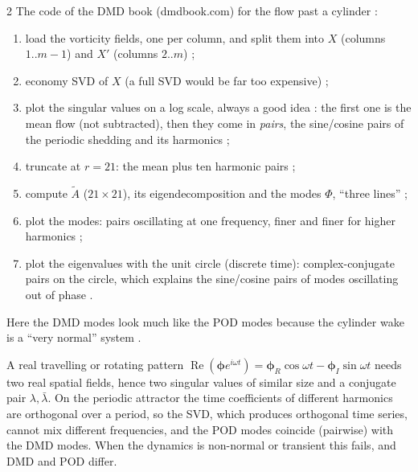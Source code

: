 \begin{paracol}{2}
The code of the DMD book (dmdbook.com) for the flow past a cylinder :
\begin{enumerate}
  \item load the vorticity fields, one per column, and split them into $X$ (columns $1..m-1$) and $X'$
        (columns $2..m$) ;
  \item economy SVD of $X$ (a full SVD would be far too expensive) ;
  \item plot the singular values on a log scale, always a good idea : the first one is the
        mean flow (not subtracted), then they come in \emph{pairs}, the sine/cosine pairs of the periodic
        shedding and its harmonics ;
  \item truncate at $r=21$: the mean plus ten harmonic pairs ;
  \item compute $\tilde A$ ($21\times21$), its eigendecomposition and the modes $\Phi$, ``three lines''
        ;
  \item plot the modes: pairs oscillating at one frequency, finer and finer for higher harmonics
        ;
  \item plot the eigenvalues with the unit circle (discrete time): complex-conjugate pairs on the circle,
        which explains the sine/cosine pairs of modes oscillating out of phase .
\end{enumerate}
Here the DMD modes look much like the POD modes because the cylinder wake is a ``very normal'' system
.

\begin{secondary}
A real travelling or rotating pattern $\operatorname{Re}(\boldsymbol\phi e^{i\omega t})=
\boldsymbol\phi_R\cos\omega t-\boldsymbol\phi_I\sin\omega t$ needs two real spatial fields, hence two
singular values of similar size and a conjugate pair $\lambda,\bar\lambda$. On the periodic attractor the
time coefficients of different harmonics are orthogonal over a period, so the SVD, which produces
orthogonal time series, cannot mix different frequencies, and the POD modes coincide (pairwise) with the
DMD modes. When the dynamics is non-normal or transient this fails, and DMD and POD differ.
\end{secondary}


\end{paracol}
